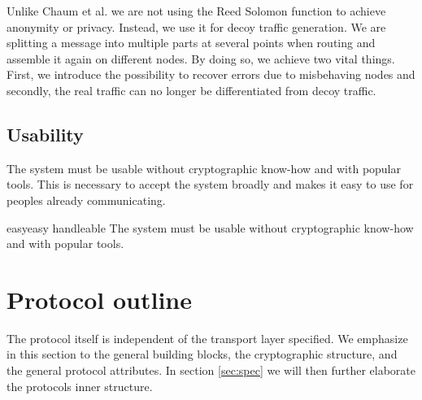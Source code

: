 Unlike Chaum et al. we are not using the Reed Solomon function to achieve anonymity or privacy. Instead, we use it for decoy traffic generation. We are splitting a message into multiple parts at several points when routing and assemble it again on different nodes. By doing so, we achieve two vital things. First, we introduce the possibility to recover errors due to misbehaving nodes and secondly, the real traffic can no longer be differentiated from decoy traffic. 

\subsection{Usability}
The system must be usable without cryptographic know-how and with popular tools. This is necessary to accept the system broadly and makes it easy to use for peoples already communicating.

\begin{requirement}{easy}{easy handleable}
    The system must be usable without cryptographic know-how and with popular tools.
\end{requirement}

\section{Protocol outline}
The protocol itself is independent of the transport layer specified. We emphasize in this section to the general building blocks, the cryptographic structure, and the general protocol attributes. In section \ref{sec:spec} we will then further elaborate the protocols inner structure.

